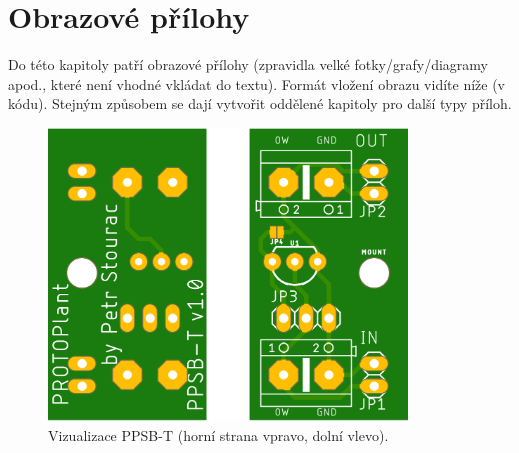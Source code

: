 \chapter{Obrazové přílohy}
Do této kapitoly patří obrazové přílohy (zpravidla velké fotky/grafy/diagramy apod., které není vhodné vkládat do textu). 
Formát vložení obrazu vidíte níže (v kódu).
Stejným způsobem se dají vytvořit oddělené kapitoly pro další typy příloh.

\begin{figure}[h]
    \centering
    \includegraphics[width=0.85\textwidth]{img/ToBeRemoved/PPSB-T_BOTH.png}
    \caption{Vizualizace PPSB-T (horní strana vpravo, dolní vlevo).}
    \label{fig:PPSB-T_VISUAL}
\end{figure}